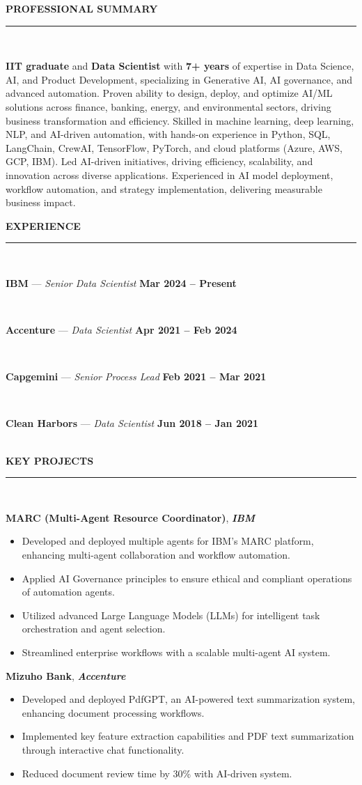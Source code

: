 \documentclass[a4paper,9pt]{article}
\newcommand{\cvsection}[2]{%
  \vspace{4pt}
  {\color{primary}\faIcon{#1}\hspace{6pt}\textbf{\fontsize{10pt}{12pt}\selectfont\uppercase{#2}}}\\[-2pt]
  \color{primary}\rule{\linewidth}{0.8pt}\\[-2pt]
  \color{textcolor}
}
\newcommand{\jobentry}[3]{%
  \vspace{2pt}
  \parbox[t]{\linewidth}{\textbf{\textcolor{primary}{#1}} --- \textit{#2} \hfill \textcolor{primary}{\textbf{#3}}}\\[-1pt]
}
\newcommand{\projectentry}[2]{%
  \vspace{2pt}
  \parbox[t]{\linewidth}{\textbf{\textcolor{primary}{#1}}, \textit{\textcolor{primary}{\textbf{#2}}}}
}
\begin{document}
\begin{paracol}{2}
  \setlength{\columnsep}{10pt}
  \setlength{\columnseprule}{0pt}

  \cvsection{user}{Professional Summary}
  \small
  \textbf{IIT graduate} and \textbf{Data Scientist} with \textbf{7+ years} of expertise in Data Science, AI, and Product Development, specializing in Generative AI, AI governance, and advanced automation. Proven ability to design, deploy, and optimize AI/ML solutions across finance, banking, energy, and environmental sectors, driving business transformation and efficiency. Skilled in machine learning, deep learning, NLP, and AI-driven automation, with hands-on experience in Python, SQL, LangChain, CrewAI, TensorFlow, PyTorch, and cloud platforms (Azure, AWS, GCP, IBM). Led AI-driven initiatives, driving efficiency, scalability, and innovation across diverse applications. Experienced in AI model deployment, workflow automation, and strategy implementation, delivering measurable business impact.

  \cvsection{briefcase}{Experience}
  \small
  \jobentry{\textbf{IBM}}{Senior Data Scientist}{Mar 2024 -- Present}
  \jobentry{\textbf{Accenture}}{Data Scientist}{Apr 2021 -- Feb 2024}
  \jobentry{Capgemini}{Senior Process Lead}{Feb 2021 -- Mar 2021}
  \jobentry{\textbf{Clean Harbors}}{Data Scientist}{Jun 2018 -- Jan 2021}

  \cvsection{project-diagram}{Key Projects}
  \small
  \projectentry{MARC (Multi-Agent Resource Coordinator)}{\textbf{IBM}}
  \begin{itemize}
    \item Developed and deployed multiple agents for IBM's MARC platform, enhancing multi-agent collaboration and workflow automation.
    \item Applied AI Governance principles to ensure ethical and compliant operations of automation agents.
    \item Utilized advanced Large Language Models (LLMs) for intelligent task orchestration and agent selection.
    \item Streamlined enterprise workflows with a scalable multi-agent AI system.
  \end{itemize}

  \projectentry{Mizuho Bank}{\textbf{Accenture}}
  \begin{itemize}
    \item Developed and deployed PdfGPT, an AI-powered text summarization system, enhancing document processing workflows.
    \item Implemented key feature extraction capabilities and PDF text summarization through interactive chat functionality.
    \item Reduced document review time by 30\% with AI-driven system.
  \end{itemize}


\end{paracol}
\end{document}
